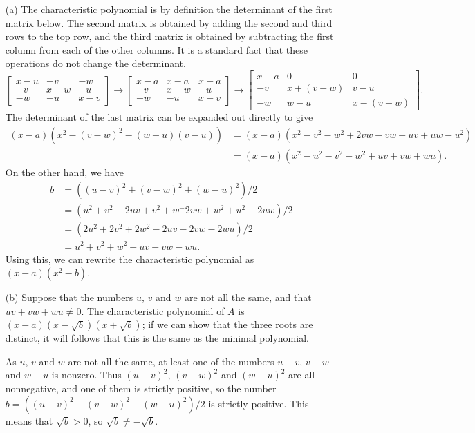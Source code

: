 \documentclass{amsart}
\newcommand{\bbm}       {\left[\begin{matrix}}
\newcommand{\ebm}       {\end{matrix}\right]}
\newcommand{\xra}       {\xrightarrow}
\renewcommand{\:}{\colon}
\theoremstyle{definition}
\renewenvironment{solution}{\SolutionAtEnd}{\endSolutionAtEnd}
\begin{document}
\begin{solution}
 \begin{itemize}
  \item[(a)] The characteristic polynomial is by definition the
   determinant of the first matrix below.  The second matrix is
   obtained by adding the second and third rows to the top row, and
   the third matrix is obtained by subtracting the first column from
   each of the other columns.  It is a standard fact that these
   operations do not change the determinant.
   \[ \bbm x-u & -v & -w \\ -v & x-w & -u \\ -w & -u & x-v \ebm \xra{}
      \bbm x-a &x-a &x-a \\ -v & x-w & -u \\ -w & -u & x-v \ebm \xra{}
      \bbm x-a &0 &0 \\ -v & x+(v-w) & v-u \\ -w & w-u & x-(v-w)\ebm.
   \]
   The determinant of the last matrix can be expanded out directly to
   give 
   \begin{align*}
    (x-a)(x^2-(v-w)^2-(w-u)(v-u)) &= 
      (x-a)(x^2-v^2-w^2+2vw-vw+uv+uw-u^2) \\
     &= (x-a)(x^2-u^2-v^2-w^2+uv+vw+wu).
   \end{align*}
   On the other hand, we have
   \begin{align*}
    b &= ((u-v)^2+(v-w)^2+(w-u)^2)/2 \\
      &= (u^2+v^2-2uv + v^2+w^-2vw + w^2+u^2-2uw)/2 \\
      &= (2u^2+2v^2+2w^2-2uv-2vw-2wu)/2 \\
      &= u^2+v^2+w^2-uv-vw-wu.
   \end{align*}
   Using this, we can rewrite the characteristic polynomial as
   $(x-a)(x^2-b)$.
  \item[(b)] Suppose that the numbers $u$, $v$ and $w$ are not all the
   same, and that $uv+vw+wu\neq 0$.  The characteristic polynomial of
   $A$ is $(x-a)(x-\sqrt{b})(x+\sqrt{b})$; if we can show that the
   three roots are distinct, it will follows that this is the same as
   the minimal polynomial.

   As $u$, $v$ and $w$ are not all the same, at least one of the
   numbers $u-v$, $v-w$ and $w-u$ is nonzero.  Thus $(u-v)^2$,
   $(v-w)^2$ and $(w-u)^2$ are all nonnegative, and one of them is
   strictly positive, so the number $b=((u-v)^2+(v-w)^2+(w-u)^2)/2$ is
   strictly positive.  This means that $\sqrt{b}>0$, so
   $\sqrt{b}\neq-\sqrt{b}$.


\end{itemize}
\end{solution}
\end{document}
